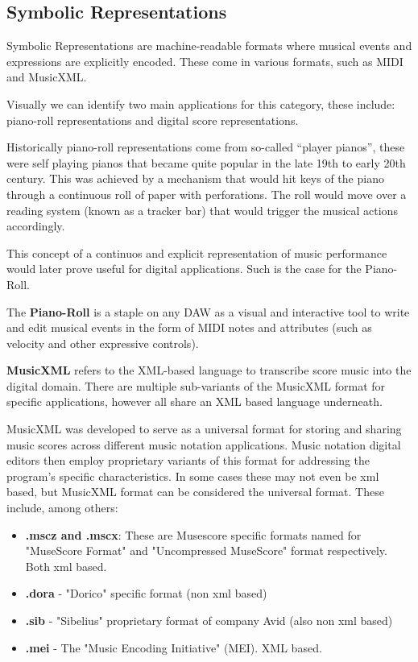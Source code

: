 \subsection{Symbolic Representations}

Symbolic Representations are machine-readable formats where musical events and expressions are explicitly encoded. These come in various formats, such as MIDI and MusicXML.

Visually we can identify two main applications for this category, these include: piano-roll representations and digital score representations. 

Historically piano-roll representations come from so-called ``player pianos'', these were self playing pianos that became quite popular in the late 19th to early 20th century. This was achieved by a mechanism that would hit keys of the piano through a continuous roll of paper with perforations. The roll would move over a reading system (known as a tracker bar) that would  trigger the musical actions accordingly. 

This concept of a continuos and explicit representation of music performance would later prove useful for digital applications. Such is the case for the Piano-Roll.

The \textbf{Piano-Roll} is a staple on any DAW as a visual and interactive tool to write and edit musical events in the form of MIDI notes and attributes (such as velocity and other expressive controls).

\textbf{MusicXML} refers to the XML-based language to transcribe score music into the digital domain. There are multiple sub-variants of the MusicXML format for specific applications, however all share an XML based language underneath. 

MusicXML was developed to serve as a universal format for storing and sharing music scores across different music notation applications. Music notation digital editors then employ proprietary variants of this format for addressing the program's specific characteristics. In some cases these may not even be xml based, but MusicXML format can be considered the universal format.
These include, among others:
\begin{itemize}
    \item \textbf{.mscz and .mscx}: These are Musescore specific formats named for "MuseScore Format" and  "Uncompressed MuseScore" format respectively. Both xml based.
    \item \textbf{.dora} - "Dorico" specific format (non xml based)
    \item \textbf{.sib}  - "Sibelius" proprietary format  of company Avid (also non xml based)
    \item \textbf{.mei}  - The "Music Encoding Initiative" (MEI). XML based.
\end{itemize}

